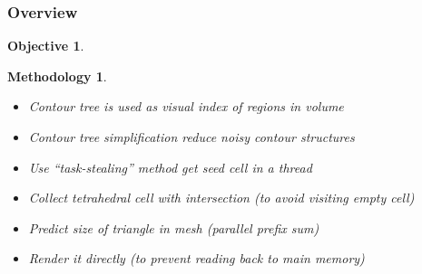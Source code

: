 \documentclass[8pt]{beamer}
\newtheorem{objective}{Objective}
\newtheorem{methodology}{Methodology}
\begin{document}
\begin{frame}
  \frametitle{Overview}
  \begin{objective}
  \end{objective}
  \begin{methodology}
    \begin{itemize}
    \item Contour tree is used as visual index of regions in volume
    \item Contour tree simplification reduce noisy contour structures
    \end{itemize}
    \begin{itemize}
    \item Use ``task-stealing'' method get seed cell in a thread
    \item Collect tetrahedral cell with intersection (to avoid visiting empty cell)
    \end{itemize}
    \begin{itemize}
    \item Predict size of triangle in mesh (parallel prefix sum)
    \item Render it directly (to prevent reading back to main memory)
    \end{itemize}
  \end{methodology}
\end{frame}
\end{document}

